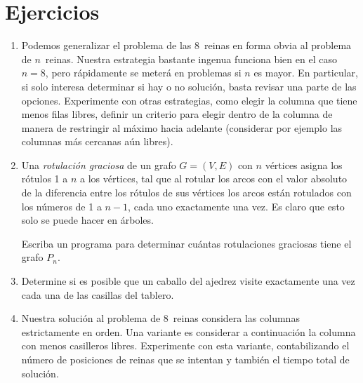 \section*{Ejercicios}
\label{sec:ejercicios-backtracking}

  \begin{enumerate}
  \item
    Podemos generalizar el problema de las 8~reinas en forma obvia
    al problema de \(n\)~reinas.
    Nuestra estrategia bastante ingenua funciona bien en el caso \(n = 8\),
    pero rápidamente se meterá en problemas si \(n\) es mayor.
    En particular,
    si solo interesa determinar si hay o no solución,
    basta revisar una parte de las opciones.
    Experimente con otras estrategias,
    como elegir la columna que tiene menos filas libres,
    definir un criterio para elegir dentro de la columna
    de manera de restringir al máximo hacia adelante
    (considerar por ejemplo las columnas más cercanas aún libres).
  \item
    Una \emph{rotulación graciosa} de un grafo \(G = (V, E)\)
    con \(n\) vértices asigna los rótulos \num{1} a \(n\) a los vértices,
    tal que al rotular los arcos
    con el valor absoluto de la diferencia entre los rótulos de sus vértices
    los arcos están rotulados con los números de \num{1} a \(n - 1\),
    cada uno exactamente una vez.
    Es claro que esto solo se puede hacer en árboles.

    Escriba un programa para determinar
    cuántas rotulaciones graciosas tiene el grafo \(P_n\).
  \item
    Determine si es posible que un caballo del ajedrez
    visite exactamente una vez cada una de las casillas del tablero.
  \item
    Nuestra solución al problema de 8~reinas
    considera las columnas estrictamente en orden.
    Una variante es considerar a continuación
    la columna con menos casilleros libres.
    Experimente con esta variante,
    contabilizando el número de posiciones de reinas que se intentan
    y también el tiempo total de solución.
  \end{enumerate}





